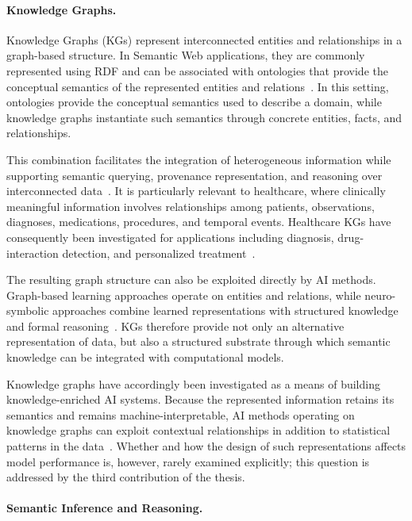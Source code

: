\paragraph{Knowledge Graphs.}

Knowledge Graphs (KGs) represent interconnected entities and relationships in a graph-based structure. In Semantic Web applications, they are commonly represented using RDF and can be associated with ontologies that provide the conceptual semantics of the represented entities and relations~\cite{xhani_role_2025}. In this setting, ontologies provide the conceptual semantics used to describe a domain, while knowledge graphs instantiate such semantics through concrete entities, facts, and relationships.

This combination facilitates the integration of heterogeneous information while supporting semantic querying, provenance representation, and reasoning over interconnected data~\cite{xhani_role_2025}. It is particularly relevant to healthcare, where clinically meaningful information involves relationships among patients, observations, diagnoses, medications, procedures, and temporal events. Healthcare KGs have consequently been investigated for applications including diagnosis, drug-interaction detection, and personalized treatment~\cite{amato_semfedxai_2025}.

The resulting graph structure can also be exploited directly by AI methods. Graph-based learning approaches operate on entities and relations, while neuro-symbolic approaches combine learned representations with structured knowledge and formal reasoning~\cite{garcez_neurosymbolic_2023,yang_give_2024}. KGs therefore provide not only an alternative representation of data, but also a structured substrate through which semantic knowledge can be integrated with computational models.

Knowledge graphs have accordingly been investigated as a means of building knowledge-enriched AI systems. Because the represented information retains its semantics and remains machine-interpretable, AI methods operating on knowledge graphs can exploit contextual relationships in addition to statistical patterns in the data~\cite{maree_quantifying_2025}. Whether and how the design of such representations affects model performance is, however, rarely examined explicitly; this question is addressed by the third contribution of the thesis.


\paragraph{Semantic Inference and Reasoning.}

